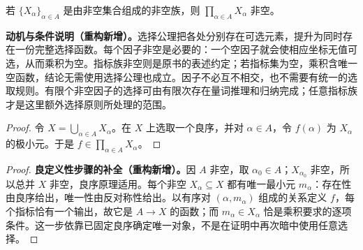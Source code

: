 \documentclass[../../main.tex]{subfiles}%
\begin{document}
\begin{axiom}[选择公理]\label{axiom:ch00-choice}
若 $\{X_\alpha\}_{\alpha\in A}$ 是由非空集合组成的非空族，则 $\prod\limits_{\alpha\in A}X_\alpha$ 非空。
\end{axiom}
\begin{remark}
\textbf{动机与条件说明（重构新增）。}选择公理把各处分别存在可选元素，提升为同时存在一份完整选择函数。每个因子非空是必要的：一个空因子就会使相应坐标无值可选，从而乘积为空。指标族非空则是原书的表述约定；若指标集为空，乘积含唯一空函数，结论无需使用选择公理也成立。因子不必互不相交，也不需要有统一的选取规则。有限个非空因子的选择可由有限次存在量词推理和归纳完成；任意指标族才是这里额外选择原则所处理的范围。
\end{remark}

\begin{proof}
令 $X=\bigcup_{\alpha\in A}X_\alpha$。在 $X$ 上选取一个良序，并对 $\alpha\in A$，令 $f(\alpha)$ 为 $X_\alpha$ 的极小元。于是 $f\in\prod\limits_{\alpha\in A}X_\alpha$。
\end{proof}
\begin{proof}
\textbf{良定义性步骤的补全（重构新增）。}因 $A$ 非空，取 $\alpha_0\in A$；$X_{\alpha_0}$ 非空，所以总并 $X$ 非空，良序原理适用。每个非空 $X_\alpha\subseteq X$ 都有唯一最小元 $m_\alpha$：存在性由良序给出，唯一性由反对称性给出。以有序对 $(\alpha,m_\alpha)$ 组成的关系定义 $f$，每个指标恰有一个输出，故它是 $A\to X$ 的函数；而 $m_\alpha\in X_\alpha$ 恰是乘积要求的逐项条件。这一步依靠已固定良序确定唯一对象，不是在证明中再次暗中使用任意选择。
\end{proof}
\end{document}
